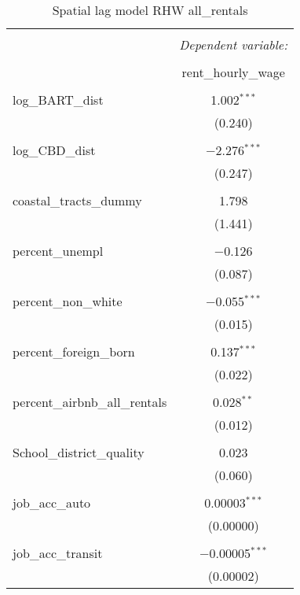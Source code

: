 \documentclass[10pt, letterpaper]{amsart}
\begin{document}
\begin{table}[H] \centering 
  \caption{Spatial lag model RHW all\_rentals} 
  \label{} 
  \begin{tabular}{@{\extracolsep{5pt}}lc} 
    \\[-1.8ex]\hline 
    \hline \\[-1.8ex] 
    & \multicolumn{1}{c}{\textit{Dependent variable:}} \\ 
    \cline{2-2} 
    \\[-1.8ex] & rent\_hourly\_wage \\ 
    \hline \\[-1.8ex] 
    log\_BART\_dist & 1.002$^{***}$ \\ 
    & (0.240) \\ 
    & \\ 
    log\_CBD\_dist & $-$2.276$^{***}$ \\ 
    & (0.247) \\ 
    & \\ 
    coastal\_tracts\_dummy & 1.798 \\ 
    & (1.441) \\ 
    & \\ 
    percent\_unempl & $-$0.126 \\ 
    & (0.087) \\ 
    & \\ 
    percent\_non\_white & $-$0.055$^{***}$ \\ 
    & (0.015) \\ 
    & \\ 
    percent\_foreign\_born & 0.137$^{***}$ \\ 
    & (0.022) \\ 
    & \\ 
    percent\_airbnb\_all\_rentals & 0.028$^{**}$ \\ 
    & (0.012) \\ 
    & \\ 
    School\_district\_quality & 0.023 \\ 
    & (0.060) \\ 
    & \\ 
    job\_acc\_auto & 0.00003$^{***}$ \\ 
    & (0.00000) \\ 
    & \\ 
    job\_acc\_transit & $-$0.00005$^{***}$ \\ 
    & (0.00002) \\ 

\end{tabular}
\end{table}
\end{document}
